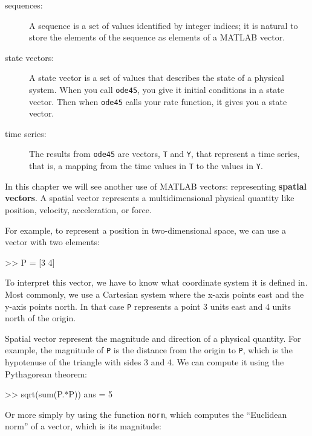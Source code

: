 \documentclass[
]{book}
\numberwithin{Answer}{chapter}
\numberwithin{Exercise}{chapter}
\begin{document}
\begin{description}

\item[sequences:] A sequence is a set of values identified by
integer indices; it is natural to store the elements of the
sequence as elements of a MATLAB vector.

\item[state vectors:] A state vector is a set of values that
describes the state of a physical system.  When you call
{\tt ode45}, you give it initial conditions in a state
vector.  Then when {\tt ode45} calls your rate function, it
gives you a state vector.

\item[time series:] The results from {\tt ode45} are vectors, {\tt T} and {\tt Y}, that represent a time series, that is, a mapping from the time values in {\tt T} to the values in {\tt Y}.

\end{description}

In this chapter we will see another use of MATLAB vectors: representing
{\bf spatial vectors}.  A spatial vector represents a multidimensional physical quantity like position, velocity, acceleration, or force.


For example, to represent a position in two-dimensional space, we can use a vector with two elements:

\begin{code}
>> P = [3 4]
\end{code}

To interpret this vector, we have to know what coordinate system it is defined in.  Most commonly, we use a Cartesian system where the x-axis points east and the y-axis points north.  In that case {\tt P} represents a point 3 units east and 4 units north of the origin.

Spatial vector represent the magnitude and direction of a physical quantity.  For example, the magnitude of {\tt P} is the distance from the origin to {\tt P}, which is the hypotenuse of the triangle with sides 3 and 4.  We can compute it using the Pythagorean theorem:

\begin{code}
>> sqrt(sum(P.*P))
ans = 5
\end{code}

Or more simply by using the function {\tt norm}, which computes the
``Euclidean norm'' of a vector, which is its magnitude:
\end{document}
